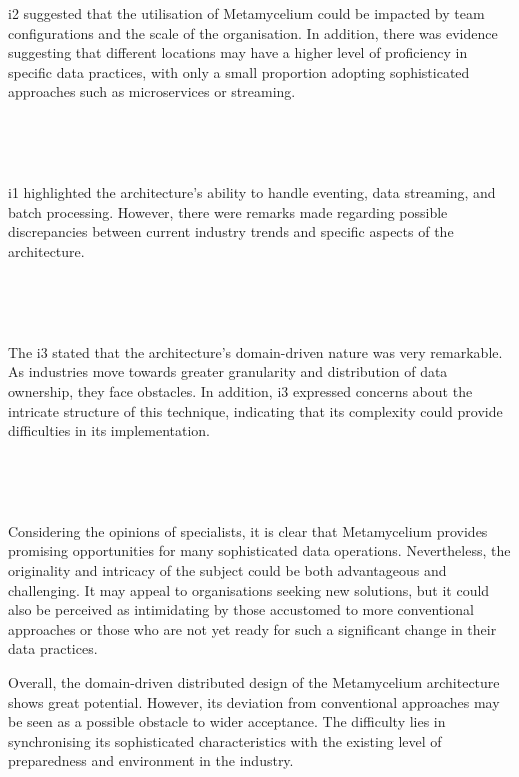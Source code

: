 \documentclass[journal]{IEEEtran}
\begin{document}
i2 suggested that the utilisation of Metamycelium could be impacted by team configurations and the scale of the organisation. In addition, there was evidence suggesting that different locations may have a higher level of proficiency in specific data practices, with only a small proportion adopting sophisticated approaches such as microservices or streaming.

\,

\setlength{\fboxsep}{0.4em}
\noindent{}

\,

i1 highlighted the architecture's ability to handle eventing, data streaming, and batch processing. However, there were remarks made regarding possible discrepancies between current industry trends and specific aspects of the architecture.


\,

\setlength{\fboxsep}{0.3em}
\noindent{}

\,

The i3 stated that the architecture's domain-driven nature was very remarkable. As industries move towards greater granularity and distribution of data ownership, they face obstacles. In addition, i3 expressed concerns about the intricate structure of this technique, indicating that its complexity could provide difficulties in its implementation.


\,

\setlength{\fboxsep}{0.4em}
\noindent{}

\,


Considering the opinions of specialists, it is clear that Metamycelium provides promising opportunities for many sophisticated data operations. Nevertheless, the originality and intricacy of the subject could be both advantageous and challenging. It may appeal to organisations seeking new solutions, but it could also be perceived as intimidating by those accustomed to more conventional approaches or those who are not yet ready for such a significant change in their data practices.

Overall, the domain-driven distributed design of the Metamycelium architecture shows great potential. However, its deviation from conventional approaches may be seen as a possible obstacle to wider acceptance. The difficulty lies in synchronising its sophisticated characteristics with the existing level of preparedness and environment in the industry.
\end{document}
